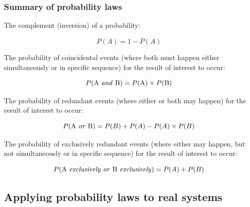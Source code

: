 










\filbreak
\subsubsection{Summary of probability laws}

\vskip 20pt

\noindent
The complement (inversion) of a probability:

$$P(A) = 1 - \overline{P}(A)$$

\vskip 30pt

\noindent
The probability of coincidental events (where both must happen either simultaneously or in specific sequence) for the result of interest to occur:

$$P(\hbox{A \textit{and} B}) = P(\hbox{A}) \times P(\hbox{B})$$

\vskip 30pt

\noindent
The probability of redundant events (where either or both may happen) for the result of interest to occur:

$$P(\hbox{A \textit{or} B}) = P(B) + P(A) - P(A) \times P(B)$$

\vskip 30pt

\noindent
The probability of exclusively redundant events (where either may happen, but not simultaneously or in specific sequence) for the result of interest to occur:

$$P(\hbox{A \textit{exclusively or} B \textit{exclusively}}) = P(A) + P(B)$$












\filbreak
\subsection{Applying probability laws to real systems}

